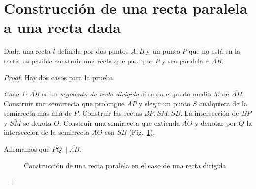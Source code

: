 {\section{Construcción de una recta paralela a una recta dada}\label{s.parallel}

\begin{theorem}\label{thm.straight-parallel}
Dada una recta $l$ definida por dos puntos $A,B$ y un punto $P$ que no está en la recta, es posible construir una recta que pase por $P$ y sea paralela a $\overline{AB}$.
\end{theorem}

\begin{proof}

Hay dos casos para la prueba.

\textit{Caso 1:}
$\overline{AB}$ es un \emph{segmento de recta dirigida} si se da el punto medio $M$ de $\overline{AB}$.  Construir una semirrecta que prolongue $\overline{AP}$ y elegir un punto $S$ cualquiera de la semirrecta más allá de $P$. Construir las rectas $\overline{BP}, \overline{SM}, \overline{SB}$. La intersección de $\overline{BP}$ y $\overline{SM}$ se denota $O$. Construir una semirrecta que extienda $\overline{AO}$ y denotar por $Q$ la intersección de la semirrecta $\overline{AO}$ con $\overline{SB}$ (Fig.~\ref{f.se-parallel-directed}).

Afirmamos que $\overline{PQ}\parallel \overline{AB}$. 

\begin{figure}[ht]
\begin{center}
\end{center}
\caption{Construcción de una recta paralela en el caso de una recta dirigida}\label{f.se-parallel-directed}
\end{figure}


\end{proof}}

